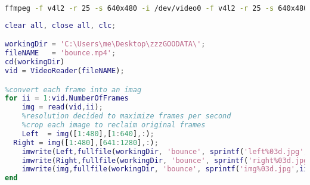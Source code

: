 \documentclass{IEEEtran}
\begin{document}
\nocite{imgProc}



\onecolumn
{}
\begin{lstlisting}[caption={Bash Camera Capture Code},language=bash]
ffmpeg -f v4l2 -r 25 -s 640x480 -i /dev/video0 -f v4l2 -r 25 -s 640x480 -i /dev/video1 -filter_complex "nullsrc=size=1280x480 [base]; [0:v] setpts=PTS-STARTPTS, scale=640x480 [left]; [1:v] setpts=PTS-STARTPTS, scale=640x480 [right]; [base][left] overlay=shortest=1 [tmp1]; [tmp1][right] overlay=shortest=1:x=640" -c:v libx264 output.mp4
\end{lstlisting}
\begin{lstlisting}[caption={MATLAB Frame Splitting Code},language=MATLAB] 
clear all, close all, clc;

workingDir = 'C:\Users\me\Desktop\zzzGOODATA\';
fileNAME   = 'bounce.mp4';
cd(workingDir)
vid = VideoReader(fileNAME);

%convert each frame into an imag
for ii = 1:vid.NumberOfFrames
    img = read(vid,ii);
    %resolution decided to maximize frames per second
    %crop each image to reclaim original frames
    Left  = img([1:480],[1:640],:);
  Right = img([1:480],[641:1280],:);
    imwrite(Left,fullfile(workingDir, 'bounce', sprintf('left%03d.jpg',ii)));
    imwrite(Right,fullfile(workingDir, 'bounce', sprintf('right%03d.jpg',ii)));
    imwrite(img,fullfile(workingDir, 'bounce', sprintf('img%03d.jpg',ii)));
end
\end{lstlisting}
\end{document}
